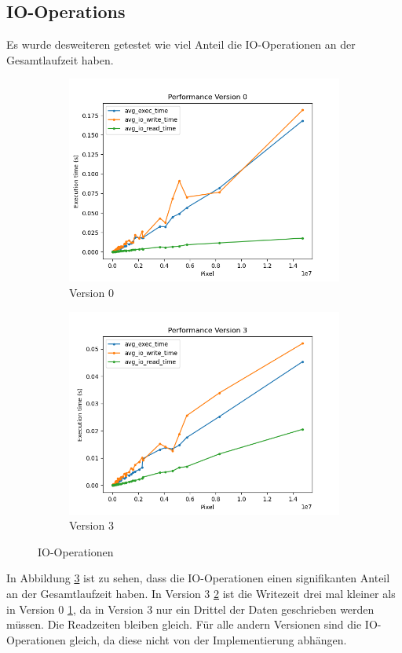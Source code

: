\documentclass[course=erap]{aspdoc}
\begin{document}
\subsection{IO-Operations}
Es wurde desweiteren getestet wie viel Anteil die IO-Operationen an der Gesamtlaufzeit haben.
\begin{figure}[H]
    \begin{subfigure}{.5\columnwidth}
        \centering
        \includegraphics[width=\columnwidth]{graphics/version0_memory.png}
        \caption{Version 0}
        \label{fig:version0}
    \end{subfigure}
    \begin{subfigure}{.5\columnwidth}
        \centering
        \includegraphics[width=\columnwidth]{graphics/version3_memory.png}
        \caption{Version 3}
        \label{fig:version3}
    \end{subfigure}
    \caption{IO-Operationen}
    \label{fig:io}
\end{figure}
In Abbildung \ref{fig:io} ist zu sehen, dass die IO-Operationen einen signifikanten Anteil an der Gesamtlaufzeit haben.
In Version 3 \ref{fig:version3} ist die Writezeit drei mal kleiner als in Version 0 \ref{fig:version0}, da in Version 3 nur ein Drittel der Daten geschrieben werden müssen.
Die Readzeiten bleiben gleich. Für alle andern Versionen sind die IO-Operationen gleich, da diese nicht von der Implementierung abhängen.
\end{document}
